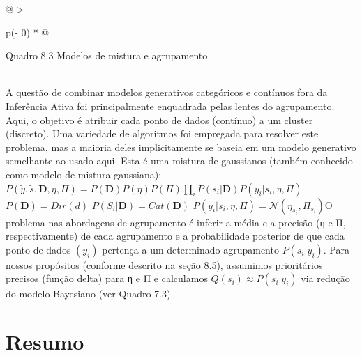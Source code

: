 \documentclass[
  12pt,
]{book}
\begin{document}
\begin{longtable}[]{@{}
  >{\raggedright\arraybackslash}p{(\columnwidth - 0\tabcolsep) * }@{}}
\toprule
\begin{minipage}[b]{\linewidth}\raggedright
Quadro 8.3 Modelos de mistura e agrupamento
\end{minipage} \\
\midrule
\endhead
A questão de combinar modelos generativos categóricos e contínuos fora da Inferência Ativa foi principalmente enquadrada pelas lentes do agrupamento. Aqui, o objetivo é atribuir cada ponto de dados (contínuo) a um cluster (discreto). Uma variedade de algoritmos foi empregada para resolver este problema, mas a maioria deles implicitamente se baseia em um modelo generativo semelhante ao usado aqui. Esta é uma mistura de gaussianos (também conhecido como modelo de mistura gaussiana):\(P(\tilde y, \tilde s, \pmb D, \eta, \Pi)=P(\pmb D)P(\eta)P(\Pi)\prod_iP(s_i|\pmb D)P(y_i|s_i,\eta,\Pi)\) \(P(\pmb D) = Dir(d)\) \(P(S_i| \pmb D)= Cat(\pmb D)\) \(P(y_i|s_i,\eta,\Pi)=\mathcal N(\eta_{s_i}, \Pi_{s_i}) \)O problema nas abordagens de agrupamento é inferir a média e a precisão (η e Π, respectivamente) de cada agrupamento e a probabilidade posterior de que cada ponto de dados \((y_i)\) pertença a um determinado agrupamento \(P(s_i|y_i)\). Para nossos propósitos (conforme descrito na seção 8.5), assumimos prioritários precisos (função delta) para η e Π e calculamos \(Q(s_i)≈P(s_i | y_i)\) via redução do modelo Bayesiano (ver Quadro 7.3). \\
\bottomrule
\end{longtable}

\hypertarget{resumo-7}{%
\section{Resumo}\label{resumo-7}}
\end{document}
